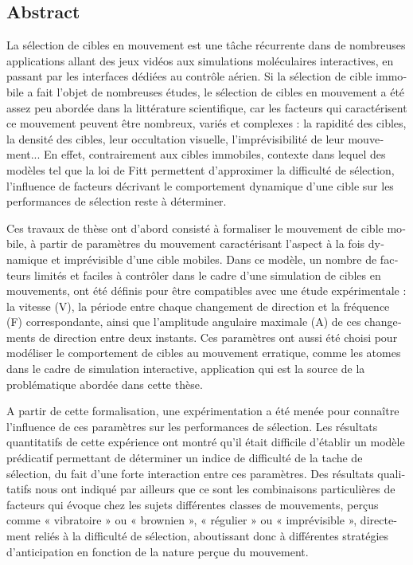 \begin{otherlanguage}{english}
%
\subsection*{Abstract}
\footnotesize

La sélection de cibles en mouvement est une tâche récurrente dans de nombreuses applications allant des jeux vidéos aux simulations moléculaires interactives, en passant par les interfaces dédiées au contrôle aérien. Si la sélection de cible immobile a fait l’objet de nombreuses études, le sélection de cibles en mouvement a été assez peu abordée dans la littérature scientifique, car les facteurs qui caractérisent ce mouvement peuvent être nombreux, variés et complexes : la rapidité des cibles, la densité des cibles, leur occultation visuelle, l’imprévisibilité de leur mouvement... En effet, contrairement aux cibles immobiles, contexte dans lequel des modèles tel que la loi de Fitt permettent d’approximer la difficulté de sélection, l’influence de facteurs décrivant le comportement dynamique d’une cible sur les performances de sélection reste à déterminer.

Ces travaux de thèse ont d’abord consisté à formaliser le mouvement de cible mobile, à partir de paramètres du mouvement caractérisant l’aspect à la fois dynamique et imprévisible d’une cible mobiles. Dans ce modèle, un nombre de facteurs limités et faciles à contrôler dans le cadre d’une simulation de cibles en mouvements, ont été définis pour être compatibles avec une étude expérimentale : la vitesse (V), la période entre chaque changement de direction et la fréquence (F) correspondante, ainsi que l’amplitude angulaire maximale (A) de ces changements de direction entre deux instants. Ces paramètres ont aussi été choisi pour modéliser le comportement de cibles au mouvement erratique, comme les atomes dans le cadre de simulation interactive, application qui est la source de la problématique abordée dans cette thèse.

A partir de cette formalisation, une expérimentation a été menée pour connaître l’influence de ces paramètres sur les performances de sélection. Les résultats quantitatifs de cette expérience ont montré qu’il était difficile d’établir un modèle prédicatif permettant de déterminer un indice de difficulté de la tache de sélection, du fait d’une forte interaction entre ces paramètres. Des résultats qualitatifs nous ont indiqué par ailleurs que ce sont les combinaisons particulières de facteurs qui évoque chez les sujets différentes classes de mouvements, perçus comme « vibratoire » ou « brownien », « régulier » ou « imprévisible », directement reliés à la difficulté de sélection, aboutissant donc à différentes stratégies d’anticipation en fonction de la nature perçue du mouvement.


\end{otherlanguage}
